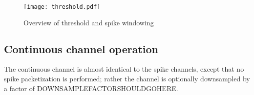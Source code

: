 \begin{figure}
\texttt{[image: threshold.pdf]}
\caption{Overview of threshold and spike windowing}
\label{threshold}
\end{figure}

\subsection{Continuous channel operation}
The continuous channel is almost identical to the spike channels, except that no spike packetization is performed; rather the channel is optionally downsampled by a factor of DOWNSAMPLEFACTORSHOULDGOHERE. 

